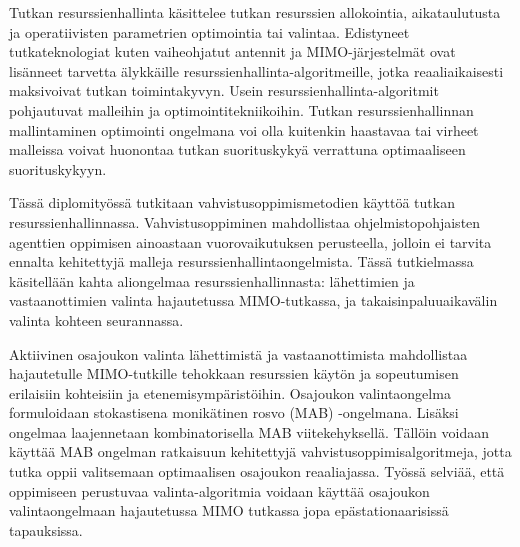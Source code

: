 \documentclass[english, 12pt, a4paper, elec, utf8, a-1b, online]{aaltothesis}
\begin{document}
\newpage
\begin{abstractpage}[finnish]
Tutkan resurssienhallinta käsittelee tutkan resurssien allokointia, aikataulutusta ja operatiivisten parametrien optimointia tai valintaa. 
Edistyneet tutkateknologiat kuten vaiheohjatut antennit ja MIMO-järjestelmät ovat lisänneet tarvetta älykkäille resurssienhallinta-algoritmeille, jotka reaaliaikaisesti maksivoivat tutkan toimintakyvyn. 
Usein resurssienhallinta-algoritmit pohjautuvat malleihin ja optimointitekniikoihin. Tutkan resurssienhallinnan mallintaminen optimointi ongelmana voi olla kuitenkin haastavaa tai virheet malleissa voivat huonontaa tutkan suorituskykyä verrattuna optimaaliseen suorituskykyyn.

Tässä diplomityössä tutkitaan vahvistusoppimismetodien käyttöä tutkan resurssienhallinnassa. Vahvistusoppiminen mahdollistaa ohjelmistopohjaisten agenttien oppimisen ainoastaan vuorovaikutuksen perusteella, jolloin ei tarvita ennalta kehitettyjä malleja resurssienhallintaongelmista.
Tässä tutkielmassa käsitellään kahta aliongelmaa resurssienhallinnasta: lähettimien ja vastaanottimien valinta hajautetussa MIMO-tutkassa, ja takaisinpaluuaikavälin valinta kohteen seurannassa.

Aktiivinen osajoukon valinta lähettimistä ja vastaanottimista mahdollistaa hajautetulle MIMO-tutkille tehokkaan resurssien käytön ja sopeutumisen erilaisiin kohteisiin ja etenemisympäristöihin. Osajoukon valintaongelma formuloidaan stokastisena monikätinen rosvo (MAB) -ongelmana. Lisäksi ongelmaa laajennetaan kombinatorisella MAB viitekehyksellä. Tällöin voidaan käyttää MAB ongelman ratkaisuun kehitettyjä vahvistusoppimisalgoritmeja, jotta tutka oppii valitsemaan optimaalisen osajoukon reaaliajassa. Työssä selviää, että oppimiseen perustuvaa valinta-algoritmia voidaan käyttää osajoukon valintaongelmaan hajautetussa MIMO tutkassa jopa epästationaarisissä tapauksissa.


\end{abstractpage}
\end{document}
